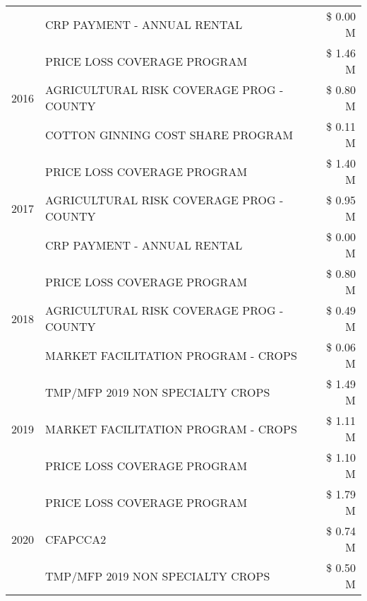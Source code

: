 \begin{tabular}{llr}
 & CRP PAYMENT - ANNUAL RENTAL & \$ 0.00 M \\
\cline{1-3}
\multirow[t]{3}{*}{2016} & PRICE LOSS COVERAGE PROGRAM & \$ 1.46 M \\
 & AGRICULTURAL RISK COVERAGE PROG - COUNTY & \$ 0.80 M \\
 & COTTON GINNING COST SHARE PROGRAM & \$ 0.11 M \\
\cline{1-3}
\multirow[t]{3}{*}{2017} & PRICE LOSS COVERAGE PROGRAM & \$ 1.40 M \\
 & AGRICULTURAL RISK COVERAGE PROG - COUNTY & \$ 0.95 M \\
 & CRP PAYMENT - ANNUAL RENTAL & \$ 0.00 M \\
\cline{1-3}
\multirow[t]{3}{*}{2018} & PRICE LOSS COVERAGE PROGRAM & \$ 0.80 M \\
 & AGRICULTURAL RISK COVERAGE PROG - COUNTY & \$ 0.49 M \\
 & MARKET FACILITATION PROGRAM - CROPS & \$ 0.06 M \\
\cline{1-3}
\multirow[t]{3}{*}{2019} & TMP/MFP 2019 NON SPECIALTY CROPS & \$ 1.49 M \\
 & MARKET FACILITATION PROGRAM - CROPS & \$ 1.11 M \\
 & PRICE LOSS COVERAGE PROGRAM & \$ 1.10 M \\
\cline{1-3}
\multirow[t]{3}{*}{2020} & PRICE LOSS COVERAGE PROGRAM & \$ 1.79 M \\
 & CFAPCCA2 & \$ 0.74 M \\
 & TMP/MFP 2019 NON SPECIALTY CROPS & \$ 0.50 M \\
\cline{1-3}
\bottomrule
\end{tabular}
